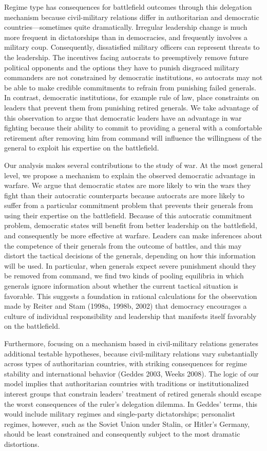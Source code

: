 \documentclass[11pt,]{article}
\begin{document}
Regime type has consequences for battlefield outcomes through this delegation mechanism because civil-military relations differ in authoritarian and democratic countries---sometimes quite dramatically. Irregular leadership change is much more frequent in dictatorships than in democracies, and frequently involves a military coup. Consequently, dissatisfied military officers can represent threats to the leadership.  The incentives facing autocrats to preemptively remove future political opponents and the options they have to punish disgraced military commanders are not constrained by democratic institutions, so autocrats may not be able to make credible commitments to refrain from punishing failed generals.  In contrast, democratic institutions, for example rule of law, place constraints on leaders that prevent them from punishing retired generals.  We take advantage of this observation to argue that democratic leaders have an advantage in war fighting because their ability to commit to providing a general with a comfortable retirement after removing him from command will influence the willingness of the general to exploit his expertise on the battlefield.

Our analysis makes several contributions to the study of war.  At the most general level, we propose a mechanism to explain the observed democratic advantage in warfare.  We argue that democratic states are more likely to win the wars they fight than their autocratic counterparts because autocrats are more likely to suffer from a particular commitment problem that prevents their generals from using their expertise on the battlefield. Because of this autocratic commitment problem, democratic states will benefit from better leadership on the battlefield, and consequently be more effective at warfare. Leaders can make inferences about the competence of their generals from the outcome of battles, and this may distort the tactical decisions of the generals, depending on how this information will be used.  In particular, when generals expect severe punishment should they be removed from command, we find two kinds of pooling equilibria in which generals ignore information about whether the current tactical situation is favorable.  This suggests a foundation in rational calculations for the observation made by Reiter and Stam (1998a, 1998b, 2002) that democracy encourages a culture of individual responsibility and leadership that manifests itself favorably on the battlefield.  

Furthermore, focusing on a mechanism based in civil-military relations generates additional testable hypotheses, because civil-military relations vary substantially across types of authoritarian countries, with striking consequences for regime stability and international behavior (Geddes 2003, Weeks 2008).  The logic of our model implies that authoritarian countries with traditions or institutionalized interest groups that constrain leaders' treatment of retired generals should escape the worst consequences of the ruler's delegation dilemma.  In Geddes' terms, this would include military regimes and single-party dictatorships; personalist regimes, however, such as the Soviet Union under Stalin, or Hitler's Germany, should be least constrained and consequently subject to the most dramatic distortions.
\end{document}
